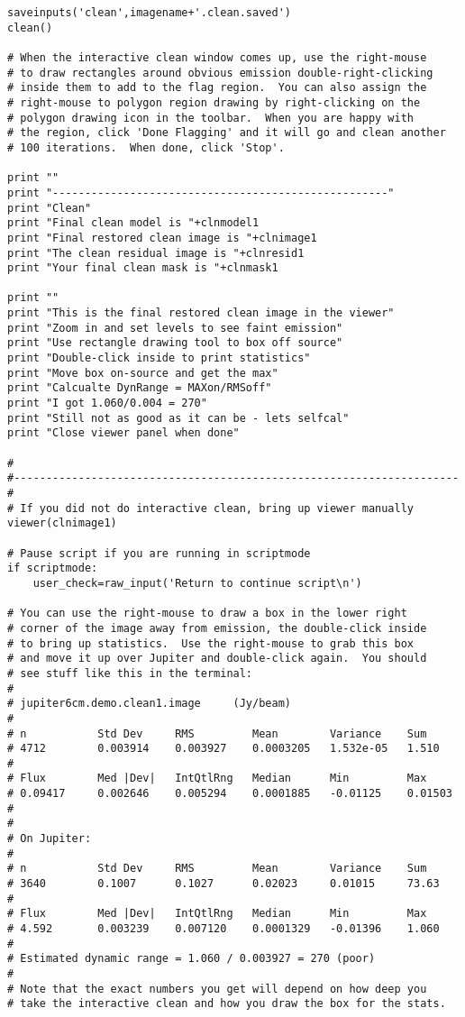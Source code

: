 \begin{verbatim}
saveinputs('clean',imagename+'.clean.saved')
clean()

# When the interactive clean window comes up, use the right-mouse
# to draw rectangles around obvious emission double-right-clicking
# inside them to add to the flag region.  You can also assign the
# right-mouse to polygon region drawing by right-clicking on the
# polygon drawing icon in the toolbar.  When you are happy with
# the region, click 'Done Flagging' and it will go and clean another
# 100 iterations.  When done, click 'Stop'.

print ""
print "----------------------------------------------------"
print "Clean"
print "Final clean model is "+clnmodel1
print "Final restored clean image is "+clnimage1
print "The clean residual image is "+clnresid1
print "Your final clean mask is "+clnmask1

print ""
print "This is the final restored clean image in the viewer"
print "Zoom in and set levels to see faint emission"
print "Use rectangle drawing tool to box off source"
print "Double-click inside to print statistics"
print "Move box on-source and get the max"
print "Calcualte DynRange = MAXon/RMSoff"
print "I got 1.060/0.004 = 270"
print "Still not as good as it can be - lets selfcal"
print "Close viewer panel when done"

#
#---------------------------------------------------------------------
#
# If you did not do interactive clean, bring up viewer manually
viewer(clnimage1)

# Pause script if you are running in scriptmode
if scriptmode:
    user_check=raw_input('Return to continue script\n')

# You can use the right-mouse to draw a box in the lower right
# corner of the image away from emission, the double-click inside
# to bring up statistics.  Use the right-mouse to grab this box
# and move it up over Jupiter and double-click again.  You should
# see stuff like this in the terminal:
#
# jupiter6cm.demo.clean1.image     (Jy/beam)
# 
# n           Std Dev     RMS         Mean        Variance    Sum
# 4712        0.003914    0.003927    0.0003205   1.532e-05   1.510     
# 
# Flux        Med |Dev|   IntQtlRng   Median      Min         Max
# 0.09417     0.002646    0.005294    0.0001885   -0.01125    0.01503   
#
#
# On Jupiter:
#
# n           Std Dev     RMS         Mean        Variance    Sum
# 3640        0.1007      0.1027      0.02023     0.01015     73.63     
# 
# Flux        Med |Dev|   IntQtlRng   Median      Min         Max
# 4.592       0.003239    0.007120    0.0001329   -0.01396    1.060     
#
# Estimated dynamic range = 1.060 / 0.003927 = 270 (poor)
#
# Note that the exact numbers you get will depend on how deep you
# take the interactive clean and how you draw the box for the stats.


\end{verbatim}
